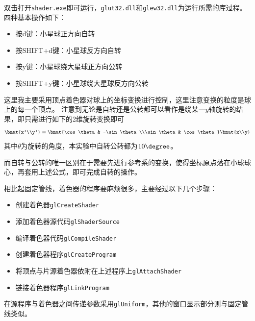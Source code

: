 \documentclass[logo,reportComp]{thesis}
\begin{document}
双击打开\verb'shader.exe'即可运行，\verb'glut32.dll'和\verb'glew32.dll'为运行所需的库过程。
四种基本操作如下：
\begin{itemize}
    \item 按d键：小星球正方向自转
    \item 按SHIFT+d键：小星球反方向自转
    \item 按y键：小星球绕大星球正方向公转
    \item 按SHIFT+y键：小星球绕大星球反方向公转
\end{itemize}

这里我主要采用顶点着色器对球上的坐标变换进行控制，这里注意变换的粒度是球上的每一个顶点。
注意到无论是自转还是公转都可以看作是绕某一$y$轴旋转的结果，即只需进行如下的2维旋转变换即可
\[\bmat{x'\\y'}=\bmat{\cos\theta & -\sin\theta\\\sin\theta & \cos\theta}\bmat{x\\y}\]
其中$\theta$为旋转的角度，本实验中自转公转都为$10\degree$。

而自转与公转的唯一区别在于需要先进行参考系的变换，使得坐标原点落在小球球心，再套用上述公式，即可完成自转的操作。

相比起固定管线，着色器的程序要麻烦很多，主要经过以下几个步骤：
\begin{itemize}
    \item 创建着色器\verb'glCreateShader'
    \item 添加着色器源代码\verb'glShaderSource'
    \item 编译着色器代码\verb'glCompileShader'
    \item 创建着色器程序\verb'glCreateProgram'
    \item 将顶点与片源着色器依附在上述程序上\verb'glAttachShader'
    \item 链接着色器程序\verb'glLinkProgram'
\end{itemize}
在源程序与着色器之间传递参数采用\verb'glUniform'，其他的窗口显示部分则与固定管线类似。
\end{document}
